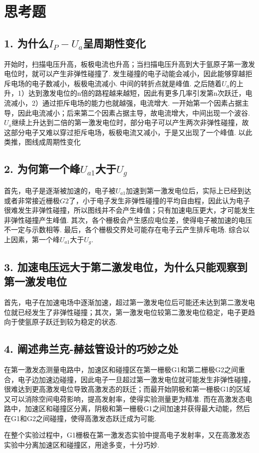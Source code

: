 \documentclass[UTF8]{ctexart}
\begin{document}
\section{思考题}
\subsection*{1. 为什么$I_P-U_a$呈周期性变化}
开始时，扫描电压升高，板极电流也升高；当扫描电压升高到大于氩原子第一激发电位时，就可以产生非弹性碰撞了. 发生碰撞的电子动能会减小，因此能够穿越拒斥电场的电子数减小，板极电流减小. 中间的转折点就是峰值. 之后随着$U_a$的上升，1）达到激发电位的n倍的路程越来越短，因此有更多几率引发第n次跃迁，电流减小，2）通过拒斥电场的能力也就越强，电流增大. 一开始第一个因素占据主导，因此电流减小；后来第二个因素占据主导，故电流增大，中间出现一个波谷. $U_a$继续上升达到二倍的第一激发电位时，部分电子可以产生两次非弹性碰撞，故这部分电子又难以穿过拒斥电场，板极电流又减小，于是又出现了一个峰值. 以此类推，图线成周期性变化\par
\subsection*{2. 为何第一个峰$U_{a1}$大于$U_g$}
首先，电子是逐渐被加速的，电子被$U_{a1}$加速到第一激发电位后，实际上已经到达或者非常接近栅极$G2$了，小于电子发生非弹性碰撞的平均自由程，因此认为电子很难发生非弹性碰撞，所以图线并不会产生峰值；只有加速电压更大，才可能发生非弹性碰撞产生峰值. 其次，各个栅极会产生感应电位差，使得电子被加速的电压不一定与示数相等. 最后，各个栅极交界处可能存在电子云产生排斥电场. 综合以上因素，第一个峰$U_{a1}$大于$U_g$.
\subsection*{3. 加速电压远大于第二激发电位，为什么只能观察到第一激发电位}
首先，电子在加速电场中逐渐加速，超过第一激发电位后可能还未达到第二激发电位就已经发生了非弹性碰撞；其次，第一激发电位较第二激发电位稳定，电子更趋向于使氩原子跃迁到较为稳定的状态.
\subsection*{4. 阐述弗兰克-赫兹管设计的巧妙之处}
在第一激发态测量电路中，加速区和碰撞区在第一栅极G1和第二栅极G2之间重合，电子边加速边碰撞，因此电子一旦超过第一激发电位就可能发生非弹性碰撞，很难达到更高激发电位导致高激发态的跃迁；而最开始阴极和第一栅极G1的区域又可以消除空间电荷影响，提高发射率，使得实验测量更为精准. 而在高激发态电路中，加速区和碰撞区分离，阴极和第一栅极G1之间加速并获得最大动能，然后在G1和G2之间碰撞，使得高激发态跃迁成为可能.\par
在整个实验过程中，G1栅极在第一激发态实验中提高电子发射率，又在高激发态实验中分离加速区和碰撞区，用途多变，十分巧妙.
\end{document}
